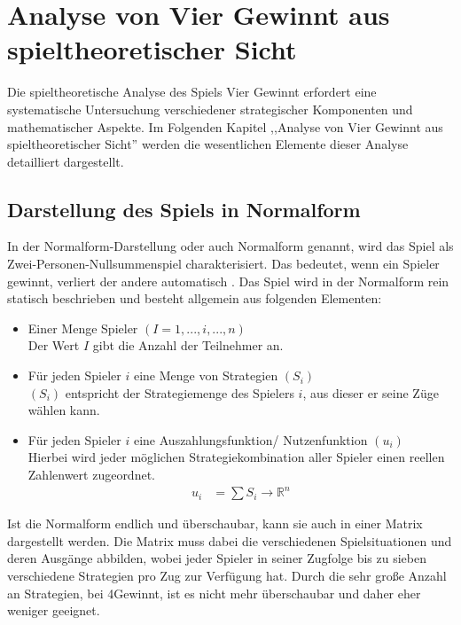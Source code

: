 \chapter{Analyse von Vier Gewinnt aus spieltheoretischer Sicht}


Die spieltheoretische Analyse des Spiels Vier Gewinnt erfordert eine systematische Untersuchung verschiedener strategischer Komponenten und mathematischer Aspekte. Im Folgenden Kapitel ,,Analyse von Vier Gewinnt aus spieltheoretischer Sicht'' werden die wesentlichen Elemente dieser Analyse detailliert dargestellt.
\section{Darstellung des Spiels in Normalform}



In der Normalform-Darstellung oder auch Normalform genannt, wird das Spiel als Zwei-Personen-Nullsummenspiel charakterisiert. Das bedeutet, wenn ein Spieler gewinnt, verliert der andere automatisch . Das Spiel wird in der Normalform rein statisch beschrieben und besteht allgemein aus folgenden Elementen\autocite{gabler_normalform}:
\begin{itemize}
	\item Einer Menge Spieler $(I = {1, ..., i, ..., n})$ 
	\\ Der Wert $I$  gibt die Anzahl der Teilnehmer an.
	
	\item Für jeden Spieler $i$ eine Menge von Strategien $(S_i)$
	\\$(S_i)$ entspricht der Strategiemenge des Spielers $i$, aus dieser er seine Züge wählen kann.
	\item Für jeden Spieler $i$ eine Auszahlungsfunktion/ Nutzenfunktion $(u_i)$
	\\Hierbei wird jeder möglichen Strategiekombination aller Spieler einen reellen Zahlenwert zugeordnet. 
	\\  \begin{align}
		u_i &= \sum S_i \rightarrow \mathbb{R}^{n}  
\end{align}
\end{itemize}

Ist die Normalform endlich und überschaubar, kann sie auch in einer Matrix dargestellt werden.
Die Matrix muss dabei die verschiedenen Spielsituationen und deren Ausgänge abbilden, wobei jeder Spieler in seiner Zugfolge bis zu sieben verschiedene Strategien pro Zug zur Verfügung hat. Durch die sehr große Anzahl an Strategien, bei 4Gewinnt, ist es nicht mehr überschaubar und daher eher weniger geeignet.
